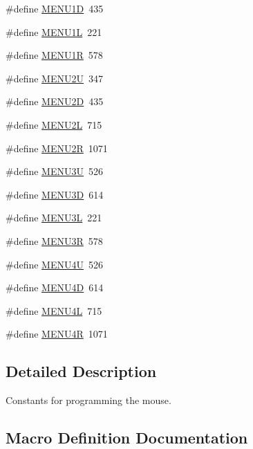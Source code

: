 \begin{DoxyCompactItemize}
\item 
\#define \hyperlink{group__mouse_gabc4d39c53c1b122b66301e6d91fec329}{M\+E\+N\+U1D}~435
\item 
\#define \hyperlink{group__mouse_gaf46df8ae7d292764e0bd733b5a69fa97}{M\+E\+N\+U1L}~221
\item 
\#define \hyperlink{group__mouse_ga280f604342f10e7da8eb79e5364f134e}{M\+E\+N\+U1R}~578
\item 
\#define \hyperlink{group__mouse_gad344b0e0080be13940f676b3fb921604}{M\+E\+N\+U2U}~347
\item 
\#define \hyperlink{group__mouse_ga5f1d419164811a353a3fb91ab934b008}{M\+E\+N\+U2D}~435
\item 
\#define \hyperlink{group__mouse_gaf9c31d922032006354f0f94d0dbfba86}{M\+E\+N\+U2L}~715
\item 
\#define \hyperlink{group__mouse_ga9ba96b159609610c99e1e56ae532ce2e}{M\+E\+N\+U2R}~1071
\item 
\#define \hyperlink{group__mouse_ga58d0568b55739b936c55a4cd70642273}{M\+E\+N\+U3U}~526
\item 
\#define \hyperlink{group__mouse_ga1bf711f126b31c1e93c4273139dda3d5}{M\+E\+N\+U3D}~614
\item 
\#define \hyperlink{group__mouse_ga261b94752f05faaea72b95f89fb4eaae}{M\+E\+N\+U3L}~221
\item 
\#define \hyperlink{group__mouse_ga4b14d3a27693996fda99359c830d3d0f}{M\+E\+N\+U3R}~578
\item 
\#define \hyperlink{group__mouse_gaaa91c726154bcb919ad804280ef7b402}{M\+E\+N\+U4U}~526
\item 
\#define \hyperlink{group__mouse_ga49904fe1a8177385da2f91915bd5e123}{M\+E\+N\+U4D}~614
\item 
\#define \hyperlink{group__mouse_ga455cfaa20c07781a8036731bd000b7f4}{M\+E\+N\+U4L}~715
\item 
\#define \hyperlink{group__mouse_ga1234a94f05b8102de0c93698aaf08085}{M\+E\+N\+U4R}~1071
\end{DoxyCompactItemize}


\subsection{Detailed Description}
Constants for programming the mouse. 

\subsection{Macro Definition Documentation}
\hypertarget{group__mouse_ga0e16a37e9b19ac48591b3899fc7580ea}{}\label{group__mouse_ga0e16a37e9b19ac48591b3899fc7580ea} 
